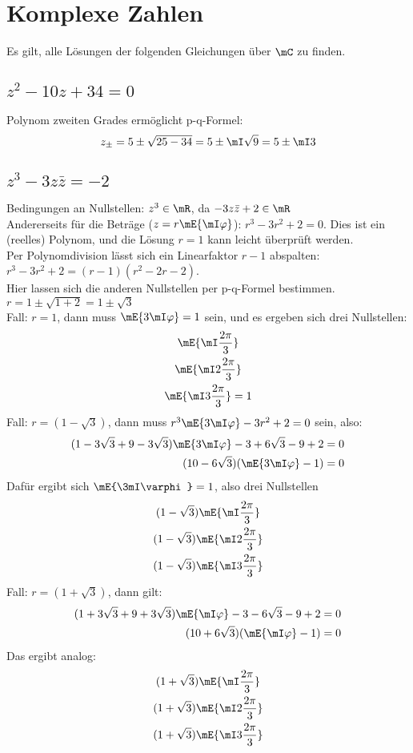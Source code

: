 \section{Komplexe Zahlen}
	Es gilt, alle Lösungen der folgenden Gleichungen über $\mC$ zu finden.
	\subsection{$z^2-10 z + 34= 0$}
	Polynom zweiten Grades ermöglicht p-q-Formel:
	\begin{equation}
		z_\pm = 5 \pm \sqrt{25-34} = 5 \pm \mI \sqrt{9} = 5 \pm \mI 3
	\end{equation}

	\subsection{$z^3-3 z\bar{z} = - 2$}
	Bedingungen an Nullstellen: $z^3 \in \mR$, da $-3z\bar{z}+2\in \mR$\\
	Andererseits für die Beträge ($z=r\mE{\mI\varphi}$): $r^3-3r^2+2=0$. Dies ist ein (reelles) Polynom, und die Lösung $r=1$ kann leicht überprüft werden.\\
	Per Polynomdivision lässt sich ein Linearfaktor $r-1$ abspalten: $r^3-3r^2+2 = (r-1)(r^2-2r-2)$.\\
	Hier lassen sich die anderen Nullstellen per p-q-Formel bestimmen. $r = 1 \pm \sqrt{1+2} = 1\pm\sqrt{3}$\\
	Fall: $r = 1$, dann muss $\mE{3\mI\varphi} = 1$ sein, und es ergeben sich drei Nullstellen: 
	\begin{gather}
		\mE{\mI\frac{2\pi}{3}} \\
		\mE{\mI 2\frac{2\pi}{3}}\\
		\mE{\mI 3\frac{2\pi}{3}}=1
	\end{gather}
	Fall: $r = (1 - \sqrt{3})$, dann muss $r^3\mE{3\mI\varphi} - 3 r^2 + 2 = 0$ sein, also:
	\begin{align}
		(1 - 3\sqrt{3} + 9 - 3\sqrt{3})\mE{3\mI\varphi} - 3 + 6 \sqrt{3} - 9 +2 & = 0 \\
		(10-6\sqrt{3})(\mE{3\mI\varphi}-1) & = 0
	\end{align}
	Dafür ergibt sich $\mE{\3mI\varphi} = 1$, also drei Nullstellen
	\begin{gather}
		(1 - \sqrt{3})\mE{\mI\frac{2\pi}{3}} \\
		(1 - \sqrt{3})\mE{\mI 2\frac{2\pi}{3}}\\
		(1 - \sqrt{3})\mE{\mI 3\frac{2\pi}{3}}
	\end{gather}
	Fall: $r = (1 + \sqrt{3})$, dann gilt:
	\begin{align}
		(1 + 3\sqrt{3} + 9 + 3\sqrt{3})\mE{\mI\varphi} - 3 - 6 \sqrt{3} - 9 +2 & = 0 \\
		(10+6\sqrt{3})(\mE{\mI\varphi}-1) & = 0
	\end{align}
	Das ergibt analog:
	\begin{gather}
		(1 + \sqrt{3})\mE{\mI\frac{2\pi}{3}} \\
		(1 + \sqrt{3})\mE{\mI 2\frac{2\pi}{3}}\\
		(1 + \sqrt{3})\mE{\mI 3\frac{2\pi}{3}}
	\end{gather}

